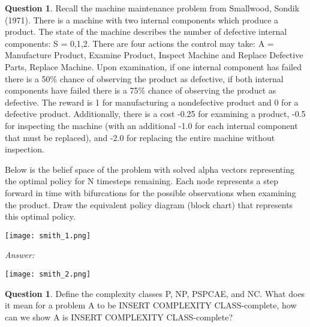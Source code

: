 \documentclass{article}
\theoremstyle{definition}
\newtheorem{question}[thm]{Question}
\newenvironment{answer}{\noindent\textit{Answer:}}{}
\begin{document}
\begin{question}
Recall the machine maintenance problem from Smallwood, Sondik (1971). There is a machine with two internal components which produce a product. The state of the machine describes the number of defective internal components: S = {0,1,2}. There are four actions the control may take: A = {Manufacture Product, Examine Product, Inspect Machine and Replace Defective Parts, Replace Machine}. Upon examination, if one internal component has failed there is a 50\% chance of observing the product as defective, if both internal components have failed there is a 75\% chance of observing the product as defective. The reward is 1 for manufacturing a nondefective product and 0 for a defective product. Additionally, there is a cost -0.25 for examining a product, -0.5 for inspecting the machine (with an additional -1.0 for each internal component that must be replaced), and -2.0 for replacing the entire machine without inspection.

Below is the belief space of the problem with solved alpha vectors representing the optimal policy for N timesteps remaining. Each node represents a step forward in time with bifurcations for the possible observations when examining the product. Draw the equivalent policy diagram (block chart) that represents this optimal policy.

\begin{center}
    \texttt{[image: smith\_1.png]}
\end{center}
\end{question}

\begin{answer} 
    \\
    \begin{center}
        \texttt{[image: smith\_2.png]}
    \end{center}
\end{answer}

\begin{question}
    Define the complexity classes P, NP, PSPCAE, and NC. What does it mean for a problem A to be INSERT COMPLEXITY CLASS-complete, how can we show A is INSERT COMPLEXITY CLASS-complete?
\end{question}
\end{document}
